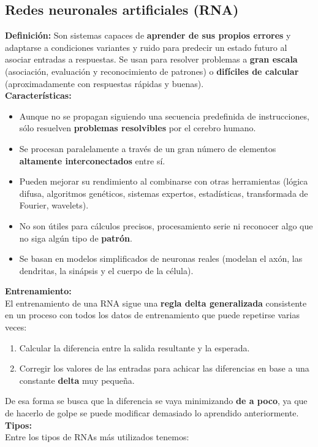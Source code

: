 \subsection*{Redes neuronales artificiales (RNA)}
\textbf{Definición:} Son sistemas capaces de \textbf{aprender de sus propios errores} y adaptarse a condiciones variantes y ruido para predecir un estado futuro al asociar entradas a respuestas. Se usan para resolver problemas a \textbf{gran escala} (asociación, evaluación y reconocimiento de patrones) o \textbf{difíciles de calcular} (aproximadamente con respuestas rápidas y buenas). \\
\textbf{Características:}
\begin{itemize}
    \item Aunque no se propagan siguiendo una secuencia predefinida de instrucciones, sólo resuelven \textbf{problemas resolvibles} por el cerebro humano.
    \item Se procesan paralelamente a través de un gran número de elementos \textbf{altamente interconectados} entre sí.
    \item Pueden mejorar su rendimiento al combinarse con otras herramientas (lógica difusa, algoritmos genéticos, sistemas expertos, estadísticas, transformada de Fourier, wavelets).
    \item No son útiles para cálculos precisos, procesamiento serie ni reconocer algo que no siga algún tipo de \textbf{patrón}.
    \item Se basan en modelos simplificados de neuronas reales (modelan el axón, las dendritas, la sinápsis y el cuerpo de la célula).
\end{itemize}
\textbf{Entrenamiento:} \\
El entrenamiento de una RNA sigue una \textbf{regla delta generalizada} consistente en un proceso con todos los datos de entrenamiento que puede repetirse varias veces:
\begin{enumerate}
    \item Calcular la diferencia entre la salida resultante y la esperada.
    \item Corregir los valores de las entradas para achicar las diferencias en base a una constante \textbf{delta} muy pequeña.
\end{enumerate}
De esa forma se busca que la diferencia se vaya minimizando \textbf{de a poco}, ya que de hacerlo de golpe se puede modificar demasiado lo aprendido anteriormente. \\
\textbf{Tipos:} \\
Entre los tipos de RNAs más utilizados tenemos:

